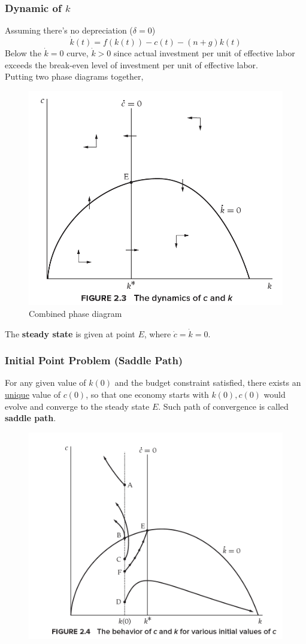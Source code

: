 \documentclass[11pt]{article}
\begin{document}
		\subsubsection{Dynamic of $k$}
		\par Assuming there's no depreciation ($\delta=0$)
		\begin{equation}
			\dot{k}(t) = f(k(t)) - c(t) - (n+g)k(t)
		\end{equation}
		Below the $\dot{k} = 0$ curve, $\dot{k} > 0$ since actual investment per unit of effective labor exceeds the break-even level of investment per unit of effective labor.
		\\
		Putting two phase diagrams together,
		\begin{figure}[h]
			\centering
			\caption{Combined phase diagram}
			\includegraphics[width=0.5\linewidth]{figures/6_3}
		\end{figure}
		The \textbf{steady state} is given at point $E$, where $\dot{c} = \dot{k} = 0$.
		
		\newpage
		\subsubsection{Initial Point Problem (Saddle Path)}
		\par For any given value of $k(0)$ and the budget constraint satisfied, there exists an \ul{unique} value of $c(0)$, so that one economy starts with $k(0), c(0)$ would evolve and converge to the steady state $E$. Such path of convergence is called \textbf{saddle path}.
		\begin{figure}[h]
			\centering
			\includegraphics[width=0.5\linewidth]{figures/6_4}
		\end{figure}
\end{document}
